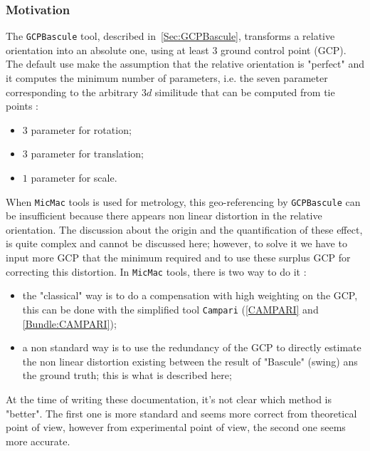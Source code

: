 \subsubsection{Motivation}

\label{NonLin:GCPBascule}

The {\tt GCPBascule} tool, described in~\ref{Sec:GCPBascule}, transforms a relative orientation
into an absolute one, using at least $3$ ground control point (GCP). The default use make
the assumption that the relative orientation is "perfect" and it computes the minimum number
of parameters, i.e. the seven parameter corresponding to the arbitrary $3d$ similitude
 that can be computed from tie points :

\begin{itemize}
   \item $3$ parameter for rotation;
   \item $3$ parameter for translation;
   \item $1$ parameter for scale.
\end{itemize}


When {\tt MicMac} tools is used for metrology, this geo-referencing by {\tt GCPBascule}
can be insufficient because there appears non linear distortion in the relative orientation. The discussion about the
origin and the quantification of these effect,  is quite complex and cannot be discussed here;
however,  to solve it we have to input more GCP that the minimum required and to use these
surplus GCP for correcting this distortion. In {\tt MicMac} tools, there is two way to do it :


\begin{itemize}
   \item the "classical" way is to do a compensation with high weighting on the GCP, this can be done
        with the simplified tool   {\tt Campari}  (\ref{CAMPARI} and \ref{Bundle:CAMPARI});

   \item a non standard way is to use the redundancy of the GCP to directly estimate the non linear distortion
        existing between the result of "Bascule" (swing) ans the ground truth; this is what is described here;

\end{itemize}

At the time of writing these documentation, it's not clear which method is "better". The first one is more
standard and seems more correct from theoretical point of view, however from experimental point of view, the
second one seems more accurate.


